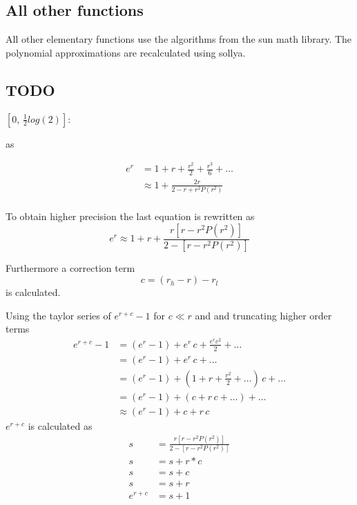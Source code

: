 \documentclass[10pt,a4paper,final,oneside]{article}
\numberwithin{equation}{subsection}
\begin{document}
\subsection{All other functions}

    All other elementary functions use the algorithms from the sun
    math library. The polynomial approximations are recalculated
    using sollya.

\subsection{TODO}
    $[0,\,\frac{1}{2}log(2)]$:

    as

    \begin{equation}
        \begin{aligned}
            e^{r} &= 1 + r + \frac{r^2}{2} + \frac{r^3}{6} + \dots \\
                  &\approx  1 + \frac {2r} {2 -r + r^2 P(r^2)} \\
        \end{aligned}
    \end{equation}

    To obtain higher precision the last equation is rewritten as
    \begin{equation}
        e^{r} \approx  1 + r + \frac{r [r -r^2 P(r^2)]} {2-[r-r^2P(r^2)]}
    \end{equation}

    Furthermore a correction term
    \[
        c = (r_h - r) - r_l
    \]
    is calculated.

    Using the taylor series of $e^{r+c}-1$ for $c \ll r$ and and truncating
    higher order terms
    \begin{equation}
        \label{equ:expm1-taylor}
        \begin{aligned}
            e^{r+c}-1 &= (e^r-1) + e^r\,c  + \frac{e^r c^2}{2} + \dots \\
                      &= (e^r-1) + e^r\,c  + \dots \\
                      &= (e^r-1) + (1+r+\frac{r^2}{2}+\dots)\,c + \dots \\
                      &= (e^r-1) + (c + r\,c + \dots) + \dots \\
                      &\approx (e^r-1) + c + r\,c
        \end{aligned}
    \end{equation}
    $e^{r+c}$ is calculated as
    \begin{equation}
        \begin{aligned}
            s &= \frac{r [r -r^2 P(r^2)]} {2-[r-r^2P(r^2)]} \\
            s &= s + r*c \\
            s &= s + c \\
            s &= s + r \\
            e^{r+c} &= s + 1
        \end{aligned}
    \end{equation}
\end{document}
